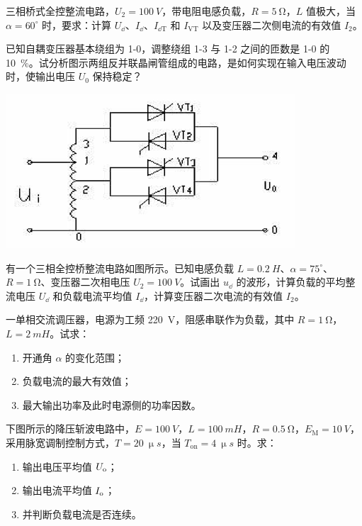 \documentclass[电力电子]{subfiles}
\begin{document}
\begin{ti}[10 分]
	三相桥式全控整流电路，$U_{2} = \SI{100}{V}$，带电阻电感负载，$R = \SI{5}{\ohm}$，$L$ 值极大，当 $\alpha = 60^\circ$ 时，要求：计算 $U_{\dd}$、$I_{\dd}$、$I_{\dd \mathrm{T}}$ 和 $I_{\mathrm{VT}}$ 以及变压器二次侧电流的有效值 $I_{2}$。
\end{ti}

\begin{ti}[10 分]
	已知自耦变压器基本绕组为 1-0，调整绕组 1-3 与 1-2 之间的匝数是 1-0 的 \SI{10}{\percent}。试分析图示两组反并联晶闸管组成的电路，是如何实现在输入电压波动时，使输出电压 $U_{0}$ 保持稳定？
	\begin{center}
		\includegraphics[scale=0.5]{figure/fig5.png}
	\end{center}
\end{ti}

\begin{ti}[10 分]
	有一个三相全控桥整流电路如图所示。已知电感负载 $L = \SI{0.2}{H}$、$\alpha = 75^\circ$、$R = \SI{1}{\ohm}$、变压器二次相电压 $U_{2} = \SI{100}{V}$。试画出 $u_{\dd}$ 的波形，计算负载的平均整流电压 $U_{\dd}$ 和负载电流平均值 $I_{\dd}$，计算变压器二次电流的有效值 $I_{2}$。
\end{ti}

\begin{ti}[10 分]
	一单相交流调压器，电源为工频 \SI{220}{V}，阻感串联作为负载，其中 $R = \SI{1}{\ohm}$，$L = \SI{2}{mH}$。试求：
	\begin{enumerate}
		\item 开通角 $\alpha$ 的变化范围；
		\item 负载电流的最大有效值；
		\item 最大输出功率及此时电源侧的功率因数。
	\end{enumerate}
\end{ti}

\begin{ti}[10 分]
	下图所示的降压斩波电路中，$E = \SI{100}{V}$，$L = \SI{100}{mH}$，$R = \SI{0.5}{\ohm}$，$E_{\mathrm{M}} = \SI{10}{V}$，采用脉宽调制控制方式，$T = \SI{20}{\upmu s}$，当 $T_{\mathrm{on}} = \SI{4}{\upmu s}$ 时。求：
	\begin{enumerate}
		\item 输出电压平均值 $U_{\mathrm{o}}$；
		\item 输出电流平均值 $I_{\mathrm{o}}$；
		\item 并判断负载电流是否连续。
	\end{enumerate}
\end{ti}
\end{document}
